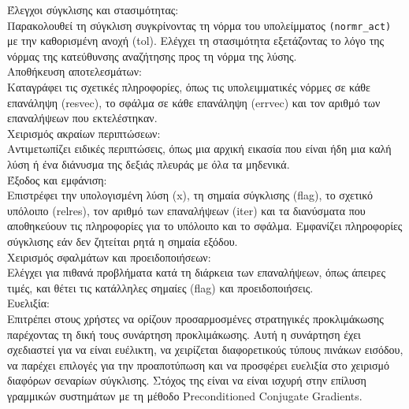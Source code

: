 \documentclass[12pt,a4paper]{article}
\begin{document}
Έλεγχοι σύγκλισης και στασιμότητας:\\
Παρακολουθεί τη σύγκλιση συγκρίνοντας τη νόρμα του υπολείμματος \texttt{(normr\_act)} με την καθορισμένη ανοχή (tol).
Ελέγχει τη στασιμότητα εξετάζοντας το λόγο της νόρμας της κατεύθυνσης αναζήτησης προς τη νόρμα της λύσης.\\

Αποθήκευση αποτελεσμάτων:\\
Καταγράφει τις σχετικές πληροφορίες, όπως τις υπολειμματικές νόρμες σε κάθε επανάληψη (resvec), το σφάλμα σε κάθε επανάληψη (errvec) και τον αριθμό των επαναλήψεων που εκτελέστηκαν.\\

Χειρισμός ακραίων περιπτώσεων:\\
Αντιμετωπίζει ειδικές περιπτώσεις, όπως μια αρχική εικασία που είναι ήδη μια καλή λύση ή ένα διάνυσμα της δεξιάς πλευράς με όλα τα μηδενικά.\\

Έξοδος και εμφάνιση:\\
Επιστρέφει την υπολογισμένη λύση (x), τη σημαία σύγκλισης (flag), το σχετικό υπόλοιπο (relres), τον αριθμό των επαναλήψεων (iter) και τα διανύσματα που αποθηκεύουν τις πληροφορίες για το υπόλοιπο και το σφάλμα.
Εμφανίζει πληροφορίες σύγκλισης εάν δεν ζητείται ρητά η σημαία εξόδου.\\

Χειρισμός σφαλμάτων και προειδοποιήσεων:\\
Ελέγχει για πιθανά προβλήματα κατά τη διάρκεια των επαναλήψεων, όπως άπειρες τιμές, και θέτει τις κατάλληλες σημαίες (flag) και προειδοποιήσεις.\\

Ευελιξία:\\
Επιτρέπει στους χρήστες να ορίζουν προσαρμοσμένες στρατηγικές προκλιμάκωσης παρέχοντας τη δική τους συνάρτηση προκλιμάκωσης.
Αυτή η συνάρτηση έχει σχεδιαστεί για να είναι ευέλικτη, να χειρίζεται διαφορετικούς τύπους πινάκων εισόδου, να παρέχει επιλογές για την προαποτύπωση και να προσφέρει ευελιξία στο χειρισμό διαφόρων σεναρίων σύγκλισης. Στόχος της είναι να είναι ισχυρή στην επίλυση γραμμικών συστημάτων με τη μέθοδο Preconditioned Conjugate Gradients.
\end{document}

